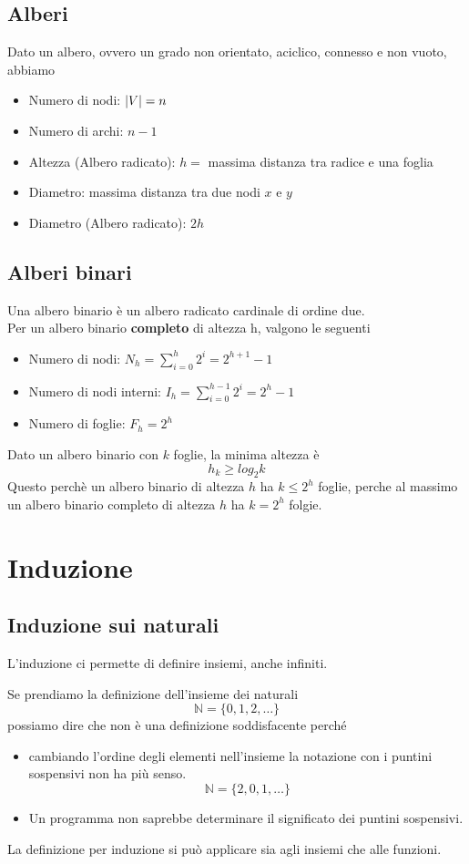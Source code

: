\documentclass{article}
\begin{document}
\subsection{Alberi}
Dato un albero, ovvero un grado non orientato, aciclico, connesso e non vuoto, abbiamo
\begin{itemize}
    \item Numero di nodi: \(\left\lvert V \right\rvert = n\)
    \item Numero di archi: \(n - 1\)
    \item Altezza (Albero radicato): \(h = \) massima distanza tra radice e una foglia
    \item Diametro: massima distanza tra due nodi \(x\) e \(y\)
    \item Diametro (Albero radicato): \(2h\)
\end{itemize}
\subsection*{Alberi binari}
Una albero binario è un albero radicato cardinale di ordine due. \\
Per un albero binario \textbf{completo} di altezza h, valgono le seguenti
\begin{itemize}
    \item Numero di nodi: \(\displaystyle N_h = \sum_{i = 0}^h 2^i = 2^{h + 1} - 1\)
    \item Numero di nodi interni: \(\displaystyle I_h = \sum_{i = 0}^{h - 1} 2^i = 2^h - 1\)
    \item Numero di foglie: \(F_h = 2^h\)
\end{itemize}
Dato un albero binario con \(k\) foglie, la minima altezza è
\[h_k \geq log_2 k\]
Questo perchè un albero binario di altezza \(h\) ha \(k \leq 2^h\) foglie, perche al massimo un albero binario completo di altezza \(h\) ha \(k = 2^h\) folgie.

\pagebreak

\section{Induzione}
\subsection{Induzione sui naturali}
L'induzione ci permette di definire insiemi, anche infiniti.
\begin{eg}
    Se prendiamo la definizione dell'insieme dei naturali
    \[\mathbb{N} = \{0,1,2,\ldots\}\]
    possiamo dire che non è una definizione soddisfacente perché
    \begin{itemize}
        \item cambiando l'ordine degli elementi nell'insieme la notazione con i puntini sospensivi non ha più senso. \[\mathbb{N} = \{2,0,1,\ldots\}\]
        \item Un programma non saprebbe determinare il significato dei puntini sospensivi.
    \end{itemize}
\end{eg}
La definizione per induzione si può applicare sia agli insiemi che alle funzioni.
\end{document}
